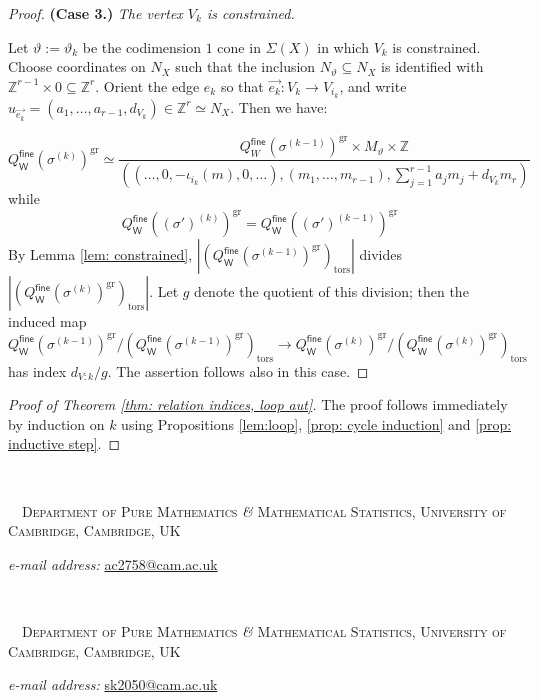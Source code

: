 \documentclass{article}
\def\Z{\mathbb{Z}}
\newcommand{\gr}{\mathrm{gr}}
\newcommand{\tors}{\mathrm{tors}}
\newcommand{\fine}{\mathsf{fine}}
\newcommand{\W}{\mathsf{W}}
\begin{document}
\begin{proof}
    \medskip
    \noindent \textbf{(Case 3.)} \emph{The vertex $V_k$ is constrained.}

    Let $\vartheta:= \vartheta_k$ be the codimension $1$ cone in $\Sigma(X)$ in which $V_k$ is constrained. Choose coordinates on $N_X$ such that the inclusion $N_\vartheta \subseteq N_X$ is identified with $\Z^{r-1} \times 0 \subseteq \Z^r$. Orient the edge $e_k$ so that $\vec{e_k}: V_k \to V_{i_k}$, and write $u_{\vec{e_k}}=(a_1,\ldots,a_{r-1},d_{V_k}) \in \Z^r \simeq N_X$.
    Then we have:

    $$
    Q_\W^\fine(\sigma^{(k)})^{\gr} \simeq \frac{Q^{\fine}_W(\sigma^{(k-1)})^{\gr} \times M_\vartheta \times \mathbb{Z}}{((\ldots, 0,-\iota_{i_k}(m),0,\dots ), (m_1 , \ldots, m_{r-1}), \sum_{j=1}^{r-1}a_j m_j+d_{V_k} m_r)}
    $$
    while 
    $$
    Q_\W^\fine((\sigma')^{(k)})^{\gr} = Q_\W^\fine((\sigma')^{(k-1)})^{\gr}
    $$
    By Lemma \ref{lem: constrained}, $|(Q_\W^\fine(\sigma^{(k-1)})^{\gr})_{\tors}|$ divides $|(Q_\W^\fine(\sigma^{(k)})^{\gr})_{\tors}|$. Let $g$ denote the quotient of this division; then the induced map 
    $$
    Q_\W^\fine(\sigma^{(k-1)})^{\gr} / (Q_\W^\fine(\sigma^{(k-1)})^{\gr})_{\tors} \to Q_\W^\fine(\sigma^{(k)})^{\gr} / (Q_\W^\fine(\sigma^{(k)})^{\gr})_{\tors}
    $$
    has index $d_{V:k} /g$. The assertion follows also in this case.
\end{proof}

\begin{proof}[Proof of Theorem \ref{thm: relation indices, loop aut}]
The proof follows immediately by induction on $k$ using Propositions \ref{lem:loop}, \ref{prop: cycle induction} and \ref{prop: inductive step}.
    
\end{proof}









$\,$\
\noindent

$\,$\
\noindent
\textsc{Department of Pure Mathematics {\it \&} Mathematical Statistics, 
University of Cambridge, Cambridge, UK}

\textit{e-mail address:} \href{mailto:ac2758@cam.ac.uk}{ac2758@cam.ac.uk}

$\,$\
\noindent

$\,$\
\noindent
\textsc{Department of Pure Mathematics {\it \&} Mathematical Statistics, 
University of Cambridge, Cambridge, UK}

\textit{e-mail address:} \href{mailto:sk2050@cam.ac.uk}{sk2050@cam.ac.uk}
\end{document}
